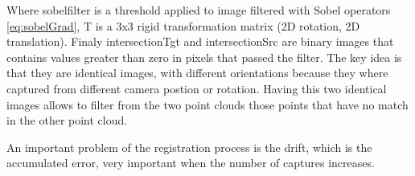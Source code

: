 Where sobelfilter is a threshold applied to image filtered with Sobel operators \ref{eq:sobelGrad}, T is a 3x3 rigid transformation matrix (2D rotation, 2D translation). 
Finaly intersectionTgt and intersectionSrc are binary images that contains values greater than zero in pixels that passed the filter. The key idea
 is that they are identical images, with different orientations because they where captured from different camera postion or rotation. Having 
this two identical images allows to filter from the two point clouds those points that have no match in the other point cloud.



An important problem of the registration process is the drift, which is the accumulated error, very important when the number of captures increases. 


 






